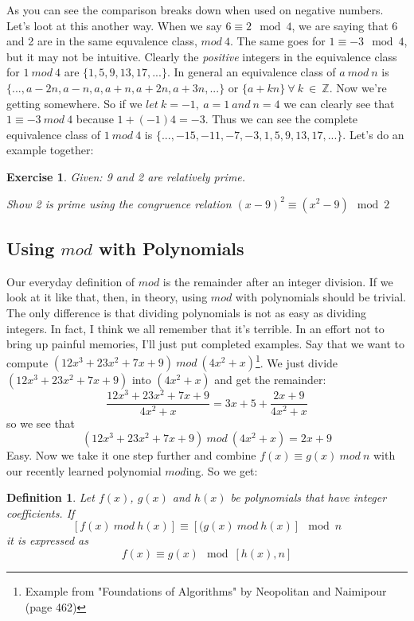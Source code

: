 \documentclass[11pt]{article}
\newtheorem{ex}{Exercise}
\newtheorem{definition}{Definition}
\begin{document}
As you can see the comparison breaks down when used on negative numbers. Let's loot at this another way. When we say $6 \equiv 2 \mod 4$, we are saying that 6 and 2 are in the same equvalence class, $mod\ 4$. The same goes for $1 \equiv-3 \mod 4$, but it may not be intuitive. Clearly the \emph{positive} integers in the equivalence class for $1\ mod\ 4$ are $\{1,5,9,13,17,...\}$. In general an equivalence class of $a\ mod\ n$ is $\{...,a-2n,a-n,a,a+n,a+2n,a+3n,...\}$ or $\{a+kn\}\ \forall\ k\ \in\ \mathbb{Z}$. Now we're getting somewhere. So if we $let\ k = -1,\ a = 1\ and\ n = 4$ we can clearly see that $1 \equiv -3\ mod\ 4$ because $1+(-1)4=-3$. Thus we can see the complete equivalence class of $1\ mod\ 4$ is $\{...,-15,-11,-7,-3,1,5,9,13,17,...\}$. Let's do an example together:

\begin{ex}
Given: 9 and 2 are relatively prime.

Show 2 is prime using the congruence relation $(x-9)^2 \equiv (x^2-9) \mod 2 $
\end{ex}
\vspace{10pc}
\subsection{Using $mod$ with Polynomials}
Our everyday definition of $mod$ is the remainder after an integer division. If we look at it like that, then, in theory, using $mod$ with polynomials should be trivial. The only difference is that dividing polynomials is not as easy as dividing integers. In fact, I think we all remember that it's terrible. In an effort not to bring up painful memories, I'll just put completed examples. Say that we want to compute $ (12x^3+23x^2+7x+9)\ mod\ (4x^2+x) $\footnote{Example from "Foundations of Algorithms" by Neopolitan and Naimipour (page 462)}. We just divide $ (12x^3+23x^2+7x+9)$ into $(4x^2+x)$ and get the remainder:
$$
\frac{12x^3+23x^2+7x+9}{4x^2+x}=3x+5+\frac{2x+9}{4x^2+x}
$$
so we see that
$$
(12x^3+23x^2+7x+9)\ mod\ (4x^2+x)=2x+9
$$
Easy. Now we take it one step further and combine $f(x) \equiv g(x)\ mod\ n$ with our recently learned polynomial $mod$ing. So we get:
\begin{definition}
Let $f(x)$, $g(x)$ and $h(x)$ be polynomials that have integer coefficients. If $$[f(x)\ mod\ h(x)] \equiv [(g(x)\ mod\ h(x)] \mod n$$ it is expressed as $$ f(x) \equiv g(x) \mod [h(x),n]$$
\end{definition}
\end{document}
